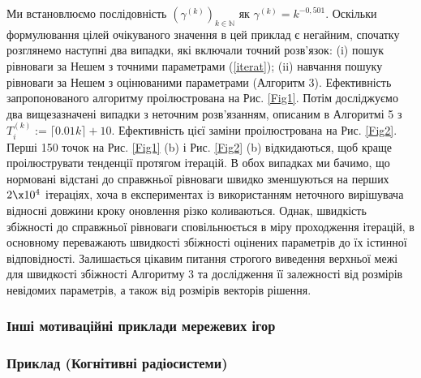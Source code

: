 \documentclass[a4paper]{article}
\begin{document}
Ми встановлюємо послідовність $(\gamma^{(k)})_{k \in \mathbb{N}}$ як $\gamma^{(k)}=k^{-0,501}$. Оскільки формулювання цілей очікуваного значення в цей приклад є негайним, спочатку розглянемо наступні два випадки, які включали точний розв'язок: (i) пошук рівноваги за Нешем з точними параметрами (\ref{iterat}); (ii) навчання пошуку рівноваги за Нешем з оцінюваними параметрами (Алгоритм 3). Ефективність запропонованого алгоритму проілюстрована на Рис. \ref{Fig1}. Потім досліджуємо два вищезазначені випадки з неточним розв'язанням, описаним в Алгоритмі 5 з $T_{i}^{(k)}:=\lceil 0.01 k\rceil+ 10$. Ефективність цієї заміни проілюстрована на Рис. \ref{Fig2}. Перші 150 точок на Рис. \ref{Fig1} (b) і Рис. \ref{Fig2} (b) відкидаються, щоб краще проілюструвати тенденції протягом ітерацій. В обох випадках ми бачимо, що нормовані відстані до справжньої рівноваги швидко зменшуються на перших $2 \x 10^{4}$ ітераціях, хоча в експериментах із використанням неточного вирішувача відносні довжини кроку оновлення різко коливаються. Однак, швидкість збіжності до справжньої рівноваги сповільнюється в міру проходження ітерацій, в основному переважають швидкості збіжності оцінених параметрів до їх істинної відповідності. Залишається цікавим питання строгого виведення верхньої межі для швидкості збіжності Алгоритму 3 та дослідження її залежності від розмірів невідомих параметрів, а також від розмірів векторів рішення.

\subsubsection{Інші мотиваційні приклади мережевих ігор}

\subsubsection*{Приклад (Когнітивні радіосистеми)}
\end{document}
